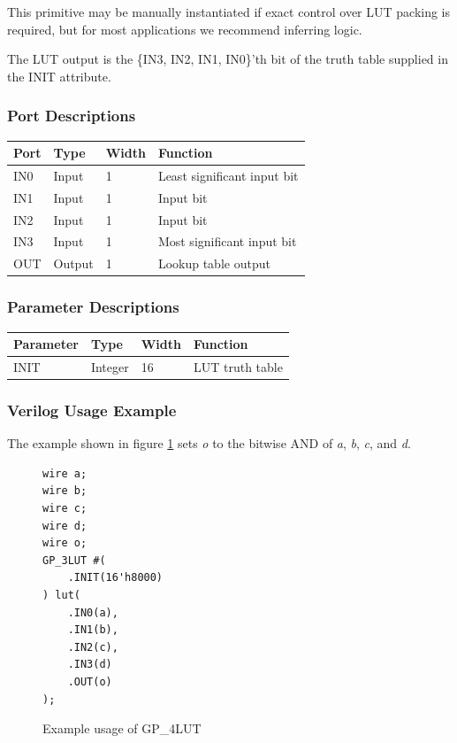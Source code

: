 \documentclass{article}
\begin{document}
This primitive may be manually instantiated if exact control over LUT packing is required, but for most applications we 
recommend inferring logic.

The LUT output is the \{IN3, IN2, IN1, IN0\}'th bit of the truth table supplied in the INIT attribute.

\subsubsection{Port Descriptions}

\begin{tabularx}{4in}{|l|l|l|X|}
\hline
{\bfseries Port} & {\bfseries Type} & {\bfseries Width} & {\bfseries Function} \\
\hline
IN0 & Input & 1 & Least significant input bit \\
\hline
IN1 & Input & 1 & Input bit \\
\hline
IN2 & Input & 1 & Input bit \\
\hline
IN3 & Input & 1 & Most significant input bit \\
\hline
OUT & Output & 1 & Lookup table output \\
\hline
\end{tabularx}

\subsubsection{Parameter Descriptions}

\begin{tabularx}{4in}{|l|l|l|X|}
\hline
{\bfseries Parameter} & {\bfseries Type} & {\bfseries Width} & {\bfseries Function} \\
\hline
INIT & Integer & 16 & LUT truth table \\
\hline
\end{tabularx}

\subsubsection{Verilog Usage Example}

The example shown in figure \ref{gp-4LUT-example} sets \emph{o} to the bitwise AND of \emph{a}, \emph{b}, \emph{c},
and \emph{d}.

\begin{figure}[h]
\begin{lstlisting}
wire a;
wire b;
wire c;
wire d;
wire o;
GP_3LUT #(
	.INIT(16'h8000)
) lut(
	.IN0(a),
	.IN1(b),
	.IN2(c),
	.IN3(d)
	.OUT(o)
);
\end{lstlisting}
\caption{Example usage of GP\_4LUT}
\label{gp-4LUT-example}
\end{figure}
\end{document}
